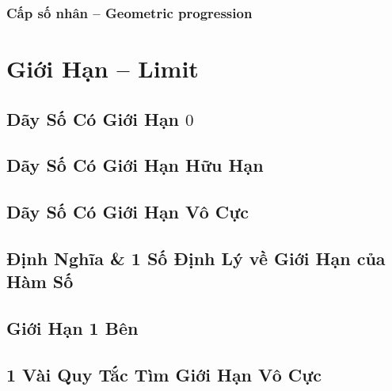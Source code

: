 \documentclass[oneside]{book}
\numberwithin{equation}{section}
\begin{document}
\subsection{Cấp số nhân -- Geometric progression}


\chapter{Giới Hạn -- Limit}

\section{Dãy Số Có Giới Hạn $0$}


\section{Dãy Số Có Giới Hạn Hữu Hạn}


\section{Dãy Số Có Giới Hạn Vô Cực}


\section{Định Nghĩa \& 1 Số Định Lý về Giới Hạn của Hàm Số}


\section{Giới Hạn 1 Bên}


\section{1 Vài Quy Tắc Tìm Giới Hạn Vô Cực}
\end{document}
